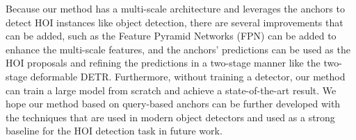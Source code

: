 \documentclass[10pt,twocolumn,letterpaper]{article}
\begin{document}
Because our method has a multi-scale architecture and leverages the anchors to detect HOI instances like object detection,
there are several improvements that can be added,
such as the Feature Pyramid Networks (FPN) \cite{lin2017feature} can be added to enhance the multi-scale features,
and the anchors' predictions can be used as the HOI proposals and refining the predictions in a two-stage manner like the two-stage deformable DETR.
Furthermore, without training a detector, our method can train a large model from scratch and achieve a state-of-the-art result.
We hope our method based on query-based anchors can be further developed with the techniques that are used in modern object detectors
and used as a strong baseline for the HOI detection task in future work.

\clearpage
{\small


}
\end{document}
